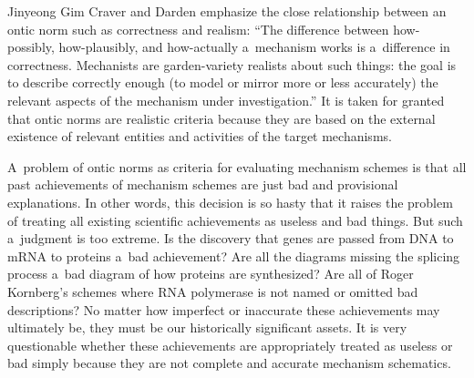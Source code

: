 \begin{artengenv}{Jinyeong Gim}
Craver and Darden
\parencite*[][p.94]{craver_search_2013} %
 emphasize the close relationship between an ontic norm such as correctness and realism: ``The difference between how-possibly, how-plausibly, and how-actually a~mechanism works is a~difference in correctness. Mechanists are garden-variety realists about such things: the goal is to describe correctly enough (to model or mirror more or less accurately) the relevant aspects of the mechanism under investigation.'' It is taken for granted that ontic norms are realistic criteria because they are based on the external existence of relevant entities and activities of the target mechanisms.

A~problem of ontic norms as criteria for evaluating mechanism schemes is that all past achievements of mechanism schemes are just bad and provisional explanations. In other words, this decision is so hasty that it raises the problem of treating all existing scientific achievements as useless and bad things. But such a~judgment is too extreme. Is the discovery that genes are passed from DNA to mRNA to proteins a~bad achievement? Are all the diagrams missing the splicing process a~bad diagram of how proteins are synthesized? Are all of Roger Kornberg's schemes where RNA polymerase is not named or omitted bad descriptions? No matter how imperfect or inaccurate these achievements may ultimately be, they must be our historically significant assets. It is very questionable whether these achievements are appropriately treated as useless or bad simply because they are not complete and accurate mechanism schematics.


\end{artengenv}
